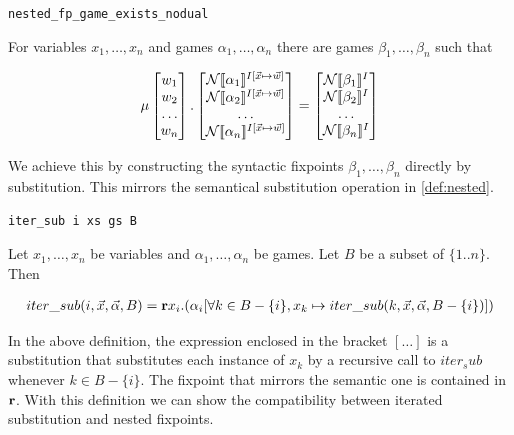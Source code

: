 \begin{btheorem}
\texttt{nested\_fp\_game\_exists\_nodual}
\label{thm:syntactic_bekic}    

For variables $x_1,\dots,x_n$ and \rlGL{} games $\alpha_1,\dots,\alpha_n$ there are \rlGL{} games $\beta_1,\dots,\beta_n$ such that

\begin{equation}
    \label{eqn:syn_Bekic}
    \mu \begin{bmatrix}
    w_1 \\ w_2 \\ \dots  \\ w_n
\end{bmatrix}. \begin{bmatrix}
    \N\ddl\alpha_1\ddr^{I[\vec{x}\mapsto \vec{w}]} \\ \N\ddl\alpha_2\ddr^{I[\vec{x}\mapsto \vec{w}]} \\
    \dots \\
    \N\ddl\alpha_n\ddr^{I[\vec{x}\mapsto \vec{w}]}
\end{bmatrix} = \begin{bmatrix}
    \N\ddl\beta_1\ddr^{I} \\ 
    \N\ddl\beta_2\ddr^{I} \\
    \dots \\
    \N\ddl\beta_n\ddr^{I}
\end{bmatrix}
\end{equation}

\end{btheorem}

We achieve this by constructing the syntactic fixpoints $\beta_1,\dots,\beta_n$ directly by substitution. This mirrors the semantical substitution operation in \autoref{def:nested}.

\begin{bdefinition}
\label{def:iter_sub}
\texttt{iter\_sub i xs gs B}

Let $x_1,\dots,x_n$ be variables and $\alpha_1,\dots,\alpha_n$ be \rlGL{} games. Let $B$ be a subset of $\{1..n\}$. Then

\begin{align}
    iter\_sub(i,\vec{x},\vec{\alpha},B)
    = \textbf{r} x_i. (\alpha_i[\forall k\in B-\{i\}, x_k\mapsto iter\_sub(k,\vec{x}, \vec{\alpha},B-\{i\})])
\end{align}
\end{bdefinition}

In the above definition, the expression enclosed in the bracket $[\dots]$ is a substitution that substitutes each instance of $x_k$ by a recursive call to $iter_sub$ whenever $k\in B-\{i\}$. The fixpoint that mirrors the semantic one is contained in $\textbf{r}$. With this definition we can show the compatibility between iterated substitution and nested fixpoints.


